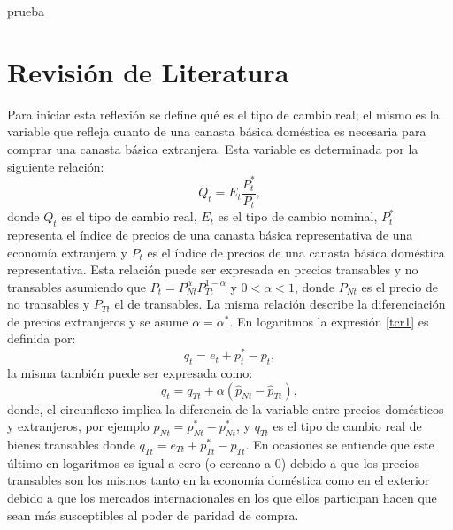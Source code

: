 \documentclass[12pt,letterpaper]{article}
\begin{document}
prueba



















\section{Revisión de Literatura}\label{pre}


Para iniciar esta reflexión se define qué es el tipo de cambio real; el mismo es la variable que refleja cuanto de una canasta básica doméstica es necesaria para comprar una canasta básica extranjera. Esta variable es determinada por la siguiente relación:
\begin{equation}\label{tcr1}
Q_t=E_t\frac{P_t^*}{P_t},
\end{equation}
donde $Q_t$ es el tipo de cambio real, $E_t$ es el tipo de cambio nominal, $P_t^*$ representa el índice de precios de una canasta básica representativa de una economía extranjera y $P_t$ es el índice de precios de una canasta básica doméstica representativa. Esta relación puede ser expresada en precios transables y no transables asumiendo que $P_t=P_{Nt}^{\alpha} P_{Tt}^{1-\alpha}$ y $0<\alpha<1$, donde $P_{Nt}$ es el precio de no transables y $P_{Tt}$ el de transables. La misma relación describe la diferenciación de precios extranjeros y se asume $\alpha=\alpha^*$. En logaritmos la expresión \ref{tcr1} es definida por:
\begin{equation}\label{tcrlog}
q_t=e_t+p_t^*-p_t,
\end{equation}
la misma también puede ser expresada como:
\begin{equation}\label{tcr2}
q_t=q_{Tt}+\alpha(\hat{p}_{Nt}-\hat{p}_{Tt}),
\end{equation}
donde, el circunflexo implica la diferencia de la variable entre precios domésticos y extranjeros, por ejemplo $\hat{p}_{Nt}=p_{Nt}^*-p_{Nt}^*$, y $q_{Tt}$ es el tipo de cambio real de bienes transables donde $q_{Tt}=e_{Tt}+p_{Tt}^*-p_{Tt}$. En ocasiones se entiende que este último en logaritmos es igual a cero (o cercano a 0) debido a que los precios transables son los mismos tanto en la economía doméstica como en el exterior debido a que los mercados internacionales en los que ellos participan hacen que sean más susceptibles al poder de paridad de compra. 
\end{document}
